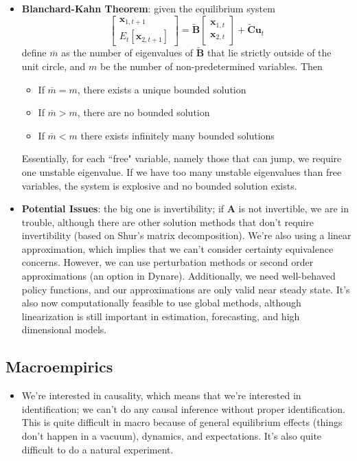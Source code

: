 \documentclass[12pt]{article}
\begin{document}
\begin{itemize}
    \item \textbf{Blanchard-Kahn Theorem}: given the equilibrium system 
    \[\begin{bmatrix}
        \textbf{x}_{1,t+1} \\
        E_t[\textbf{x}_{2,t+1}]
        \end{bmatrix} = \boldsymbol{\widetilde{B}}\begin{bmatrix}
        \textbf{x}_{1,t}\\
        \textbf{x}_{2,t}
        \end{bmatrix} + \boldsymbol{\widetilde{C}}\textbf{u}_t
    \]
    define $\overline{m}$ as the number of eigenvalues of $\boldsymbol{\widetilde{B}}$ that lie strictly outside of the unit circle, and $m$ be the number of non-predetermined variables. Then
    \begin{itemize}
        \item If $\overline{m} = m$, there exists a unique bounded solution
        \item If $\overline{m} > m$, there are no bounded solution
        \item If $\overline{m} < m$ there exists infinitely many bounded solutions
    \end{itemize}
    Essentially, for each ``free" variable, namely those that can jump, we require one unstable eigenvalue. If we have too many unstable eigenvalues than free variables, the system is explosive and no bounded solution exists.
    \item \textbf{Potential Issues}: the big one is invertibility; if $\textbf{A}$ is not invertible, we are in trouble, although there are other solution methods that don't require invertibility (based on Shur's matrix decomposition). We're also using a linear approximation, which implies that we can't consider certainty equivalence concerns. However, we can use perturbation methods or second order approximations (an option in Dynare). Additionally, we need well-behaved policy functions, and our approximations are only valid near steady state. It's also now computationally feasible to use global methods, although linearization is still important in estimation, forecasting, and high dimensional models.
\end{itemize}

\subsection{Macroempirics}

\begin{itemize}
    \item We're interested in causality, which means that we're interested in identification; we can't do any causal inference without proper identification. This is quite difficult in macro because of general equilibrium effects (things don't happen in a vacuum), dynamics, and expectations. It's also quite difficult to do a natural experiment.
\end{itemize}
\end{document}
